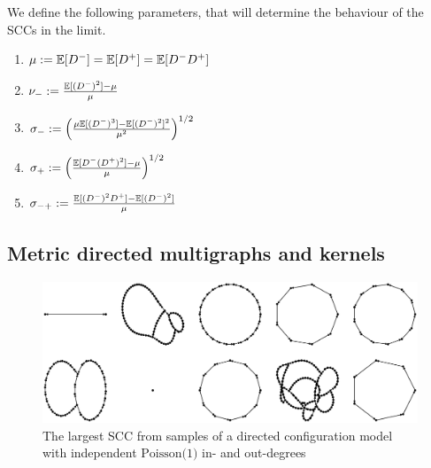 We define the following parameters, that will determine the behaviour of the SCCs in the limit.
\begin{enumerate}
    \item $\mu:={\mathbb E}[D^-]={\mathbb E}[D^+]={\mathbb E}[D^-D^+]$
    \item $\nu_-:=\frac{{\mathbb E}[(D^-)^2]-\mu}{\mu}$ 
    \item $\sigma_-:=\left(\frac{\mu{\mathbb E}[(D^-)^3]-{\mathbb E}[(D^-)^2]^2}{\mu^2}\right)^{1/2}$ 
    \item $\sigma_+:=\left(\frac{{\mathbb E}[D^-(D^+)^2]-\mu}{\mu}\right)^{1/2}$ 
    \item $\sigma_{-+}:=\frac{{\mathbb E}[(D^-)^2D^+]-{\mathbb E}[(D^-)^2]}{\mu}$ 
\end{enumerate}
\subsection{Metric directed multigraphs and kernels}\label{subsec.mdmkernels}

\begin{figure}[htbp]
    \centering

    \includegraphics[width=\textwidth]{Content/Pictures/largest_sccs.eps}
    
    \caption{The largest SCC from samples of a directed configuration model with independent $\text{Poisson(1)}$ in- and out-degrees}
    \label{fig:largest-sccs}
\end{figure}

